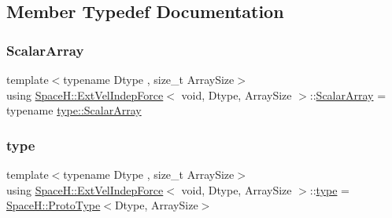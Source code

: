 \subsection{Member Typedef Documentation}
\mbox{\label{struct_space_h_1_1_ext_vel_indep_force_3_01void_00_01_dtype_00_01_array_size_01_4_ab186d960b853d69afb7cdbb19af71639}} 
\subsubsection{\texorpdfstring{Scalar\+Array}{ScalarArray}}
{\footnotesize\ttfamily template$<$typename Dtype , size\+\_\+t Array\+Size$>$ \\
using \mbox{\hyperlink{struct_space_h_1_1_ext_vel_indep_force}{Space\+H\+::\+Ext\+Vel\+Indep\+Force}}$<$ void, Dtype, Array\+Size $>$\+::\mbox{\hyperlink{struct_space_h_1_1_ext_vel_indep_force_3_01void_00_01_dtype_00_01_array_size_01_4_ab186d960b853d69afb7cdbb19af71639}{Scalar\+Array}} =  typename \mbox{\hyperlink{struct_space_h_1_1_proto_type_a09ef91dc8a37a044c403f5a833044725}{type\+::\+Scalar\+Array}}}

\mbox{\label{struct_space_h_1_1_ext_vel_indep_force_3_01void_00_01_dtype_00_01_array_size_01_4_a1d5ec14368fdd57d1cea251229ba72f7}} 
\subsubsection{\texorpdfstring{type}{type}}
{\footnotesize\ttfamily template$<$typename Dtype , size\+\_\+t Array\+Size$>$ \\
using \mbox{\hyperlink{struct_space_h_1_1_ext_vel_indep_force}{Space\+H\+::\+Ext\+Vel\+Indep\+Force}}$<$ void, Dtype, Array\+Size $>$\+::\mbox{\hyperlink{struct_space_h_1_1_ext_vel_indep_force_3_01void_00_01_dtype_00_01_array_size_01_4_a1d5ec14368fdd57d1cea251229ba72f7}{type}} =  \mbox{\hyperlink{struct_space_h_1_1_proto_type}{Space\+H\+::\+Proto\+Type}}$<$Dtype, Array\+Size$>$}

